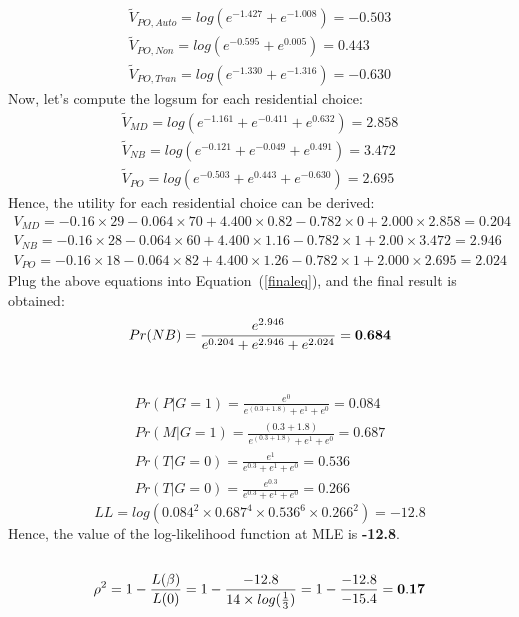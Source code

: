 \documentclass[11pt]{article}
\begin{document}
\newpage
\begin{align}
\tilde{V}_{PO,Auto}=log(e^{-1.427}+e^{-1.008})=-0.503\\
\tilde{V}_{PO,Non}=log(e^{-0.595}+e^{0.005})=0.443\\
\tilde{V}_{PO,Tran}=log(e^{-1.330}+e^{-1.316})=-0.630
\end{align}
Now, let's compute the logsum for each residential choice:
\begin{align}
\tilde{V}_{MD}=log(e^{-1.161}+e^{-0.411}+e^{0.632})=2.858\\
\tilde{V}_{NB}=log(e^{-0.121}+e^{-0.049}+e^{0.491})=3.472\\
\tilde{V}_{PO}=log(e^{-0.503}+e^{0.443}+e^{-0.630})=2.695
\end{align}
Hence, the utility for each residential choice can be derived:
\begin{align}
V_{MD}=-0.16\times29-0.064\times70+4.400\times0.82-0.782\times0+2.000\times2.858=0.204\\
V_{NB}=-0.16\times28-0.064\times60+4.400\times1.16-0.782\times1+2.00\times3.472=2.946\\
V_{PO}=-0.16\times18-0.064\times82+4.400\times1.26-0.782\times1+2.000\times2.695=2.024
\end{align}
Plug the above equations into Equation~(\ref{finaleq}), and the final result is obtained:
\begin{equation}
Pr(NB)=\frac{e^{2.946}}{e^{0.204}+e^{2.946}+e^{2.024}}=\bf{0.684}
\end{equation}
\section{}
\subsection{}
\begin{align}
Pr(P|G=1)=\frac{e^0}{e^{(0.3+1.8)}+e^1+e^0}=0.084\\
Pr(M|G=1)=\frac{(0.3+1.8)}{e^{(0.3+1.8)}+e^1+e^0}=0.687\\
Pr(T|G=0)=\frac{e^1}{e^{0.3}+e^1+e^0}=0.536\\
Pr(T|G=0)=\frac{e^0.3}{e^{0.3}+e^1+e^0}=0.266
\end{align}
\begin{equation}
LL=log(0.084^2\times0.687^4\times0.536^6\times0.266^2)=-12.8
\end{equation}
Hence, the value of the log-likelihood function at MLE is \textbf{-12.8}.
\subsection{}
\begin{equation}
\rho^2=1-\frac{L(\beta)}{L(0)}=1-\frac{-12.8}{14\times log(\frac{1}{3})}=1-\frac{-12.8}{-15.4}=\bf{0.17}
\end{equation}
\end{document}
